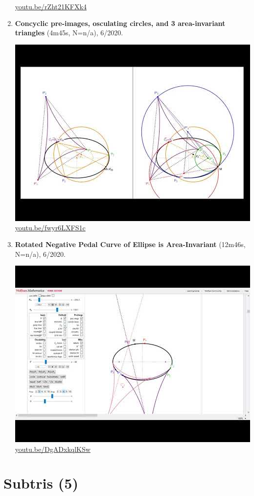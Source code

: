 \documentclass[12pt]{amsart}
\begin{document}
\begin{enumerate}[resume]
\begin{center}
\href{https://youtu.be/rZht21KFXk4}{\url{youtu.be/rZht21KFXk4}}\end{center}
% 
\item \textbf{Concyclic pre-images, osculating circles, and 3 area-invariant triangles} (4m45s, N=n/a), 6/2020. 
\begin{center}\includegraphics[width=.5\textwidth]{pics/fwyr6LXFS1c.jpg} \\ 
\href{https://youtu.be/fwyr6LXFS1c}{\url{youtu.be/fwyr6LXFS1c}}\end{center}
% 
\item \textbf{Rotated Negative Pedal Curve of Ellipse is Area-Invariant} (12m46s, N=n/a), 6/2020. 
\begin{center}\includegraphics[width=.5\textwidth]{pics/DgADxkqlKSw.jpg} \\ 
\href{https://youtu.be/DgADxkqlKSw}{\url{youtu.be/DgADxkqlKSw}}\end{center}
% 
\end{enumerate}

\section{Subtris (5)}
\end{document}
